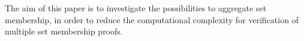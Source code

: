 The aim of this paper is to investigate the possibilities to aggregate set membership, in order to reduce the computational complexity for verification of multiple set membership proofs. 










